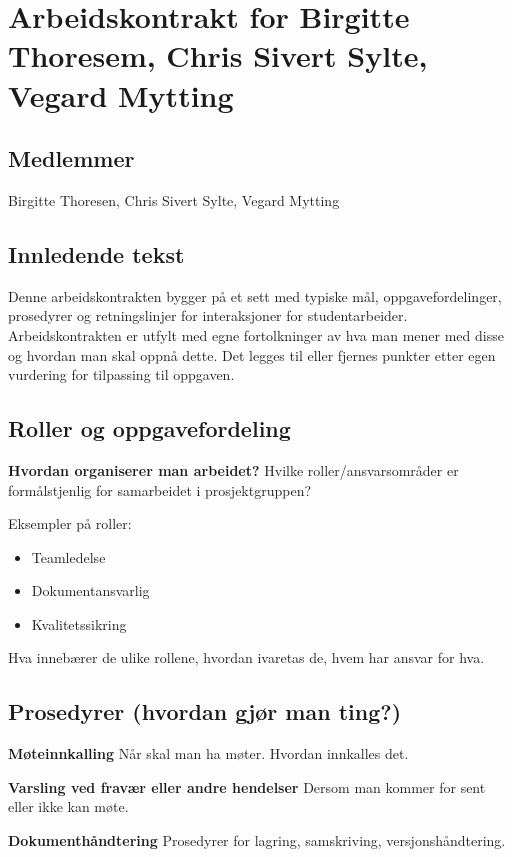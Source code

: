 \chapter{Arbeidskontrakt for Birgitte Thoresem, Chris Sivert Sylte, Vegard Mytting}

\section*{Medlemmer}
Birgitte Thoresen, Chris Sivert Sylte, Vegard Mytting

\section*{Innledende tekst}
Denne arbeidskontrakten bygger på et sett med typiske mål, oppgavefordelinger, prosedyrer og retningslinjer for interaksjoner for studentarbeider. Arbeidskontrakten er utfylt med egne fortolkninger av hva man mener med disse og hvordan man skal oppnå dette.  
Det legges til eller fjernes punkter etter egen vurdering for tilpassing til oppgaven.

\section*{Roller og oppgavefordeling}
\textbf{Hvordan organiserer man arbeidet?}  
Hvilke roller/ansvarsområder er formålstjenlig for samarbeidet i prosjektgruppen?  

Eksempler på roller:  
\begin{itemize}
    \item Teamledelse
    \item Dokumentansvarlig
    \item Kvalitetssikring
\end{itemize}

Hva innebærer de ulike rollene, hvordan ivaretas de, hvem har ansvar for hva.

\section*{Prosedyrer (hvordan gjør man ting?)}
    \item \textbf{Møteinnkalling}  
    Når skal man ha møter. Hvordan innkalles det.

    \item \textbf{Varsling ved fravær eller andre hendelser}  
    Dersom man kommer for sent eller ikke kan møte.

    \item \textbf{Dokumenthåndtering}  
    Prosedyrer for lagring, samskriving, versjonshåndtering.

